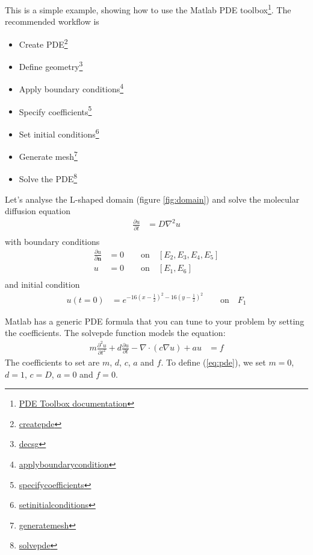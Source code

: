 \documentclass[11pt, a4paper]{article}
\begin{document}
This is a simple example, showing how to use the Matlab PDE toolbox\footnote{\href{https://www.mathworks.com/help/releases/R2017a/pde/index.html}{PDE Toolbox documentation}}. The recommended workflow is
\begin{itemize}
	\item Create PDE\footnote{\href{https://www.mathworks.com/help/releases/R2017a/pde/ug/createpde.html}{createpde}}
	\item Define geometry\footnote{\href{https://www.mathworks.com/help/releases/R2017a/pde/ug/decsg.html}{decsg}}
	\item Apply boundary conditions\footnote{\href{https://www.mathworks.com/help/releases/R2017a/pde/ug/applyboundarycondition.html}{applyboundarycondition}}
	\item Specify coefficients\footnote{\href{https://www.mathworks.com/help/releases/R2017a/pde/ug/specifycoefficients.html}{specifycoefficients}}
	\item Set initial conditions\footnote{\href{https://www.mathworks.com/help/releases/R2017a/pde/ug/setinitialconditions.html}{setinitialconditions}}
	\item Generate mesh\footnote{\href{https://www.mathworks.com/help/releases/R2017a/pde/ug/generatemesh.html}{generatemesh}}
	\item Solve the PDE\footnote{\href{https://www.mathworks.com/help/releases/R2017a/pde/ug/solvepde.html}{solvepde}}
\end{itemize}


Let's analyse the L-shaped domain (figure \ref{fig:domain}) and solve the molecular diffusion equation 
\begin{align}
\frac{\partial u}{\partial t} &= D \nabla^2 u \\ \label{eq:pde}
\end{align}
with boundary conditions
\begin{align}
\frac{\partial u}{\partial \textbf{n}} &= 0  \qquad \textrm{on} \quad [E_2, E_3, E_4, E_5] \label{eq:bc1}\\
u &= 0 \qquad \textrm{on} \quad [E_1, E_6] \label{eq:bc2}\\
\end{align}
and initial condition
\begin{align}
u(t=0) &= e^{-16(x-\frac{1}{2})^2-16(y-\frac{1}{2})^2}	\qquad \textrm{on} \quad F_1 \label{eq:init}
\end{align}


Matlab has a generic PDE formula that you can tune to your problem by setting the coefficients. The solvepde function models the equation:
\begin{align}
m\frac{\partial^2 u}{\partial t^2} + d\frac{\partial u}{\partial t} - \nabla \cdot (c\nabla u) + au &= f \label{eq:pde_ref}	
\end{align}
The coefficients to set are $m$, $d$, $c$, $a$ and $f$. To define (\ref{eq:pde}), we set $m=0$, $d=1$, $c=D$, $a=0$ and $f=0$.
\end{document}
